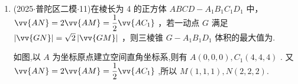 \begin{enumerate}
\begin{jieda}
        可设 $\vv{a} = \left( {1,0,0}\right) ,\vv{b} = \left( {0,1,0}\right) ,\vv{c} = \left( {0,0,1}\right)$ ,设 $\vv{p} =  \left( {x,y,z}\right)$ ,则 $\vv{p} - 2\vv{a} = \left( {x - 2,y,z}\right) ,\vv{p} - 2\vv{b} = \left( {x,y - 2,z}\right)$ , 所以 $\left\{  \begin{array}{l} {\left( x - 2\right) }^{2} + {y}^{2} + {z}^{2} = \dfrac{9}{4} \\  {x}^{2} + {\left( y - 2\right) }^{2} + {z}^{2} = \dfrac{9}{4} \end{array}\right.$ ,两式相减可得: $x = y$ ,再代入第一个式子,可得: $2{x}^{2} + {z}^{2} = {4x} - \dfrac{7}{4}$ ,设向量 $\vv{p}$ 与向量 $\vv{c}$ 夹角为 $\theta$ ,则 $\cos \theta  = \dfrac{z}{\sqrt{{x}^{2} + {y}^{2} + {z}^{2}}} = \dfrac{\sqrt{{4x} - \dfrac{7}{4} - 2{x}^{2}}}{\sqrt{{4x} - \dfrac{7}{4}}} =  \sqrt{1 - \dfrac{2{x}^{2}}{{4x} - \dfrac{7}{4}}} = \sqrt{1 - \dfrac{2}{\dfrac{4}{x} - \dfrac{7}{4{x}^{2}}}}$ ,易知对于 $y =  - \dfrac{7}{4{x}^{2}} + \dfrac{4}{x}$ 当 $\dfrac{1}{x} = \dfrac{8}{7}$ 即 $x = \dfrac{7}{8}$ 取得最大值 $\dfrac{16}{7}$ ,此时 $\sqrt{1 - \dfrac{2}{\dfrac{4}{x} - \dfrac{7}{4{x}^{2}}}}$ 取得最大值 $\dfrac{\sqrt{2}}{4}$ ，即 $\cos \theta$ 的最大值为 $\dfrac{\sqrt{2}}{4}$ ， $x = \dfrac{7}{8}$ 时取得，再由余弦函数的单调性可知 $\theta$ 的最小值为 $\arccos \dfrac{\sqrt{2}}{4}$.
    \end{jieda}
    \item (2025$\cdot$普陀区二模$\cdot$11)在棱长为 4 的正方体 ${ABCD} - {A}_{1}{B}_{1}{C}_{1}{D}_{1}$ 中， $\vv{AN} = 2\vv{AM} = \dfrac{1}{2}\vv{A{C}_{1}}$ ，若一动点 $G$ 满足 $\left| \vv{GN}\right|  = \sqrt{2}\left| \vv{GM}\right|$ ，则三棱锥 $G - {A}_{1}{B}_{1}{D}_{1}$ 体积的最大值为.
    \begin{jieda}
        如图,以 $A$ 为坐标原点建立空间直角坐标系,则有 $A\left( {0,0,0}\right) ,{C}_{1}\left( {4,4,4}\right)$ . 又 $\vv{AN} = 2\vv{AM} = \dfrac{1}{2}\vv{A{C}_{1}}$ ,所以 $M(1,1,1),N\left( {2,2,2}\right)$.
        

\end{jieda}
\end{enumerate}
